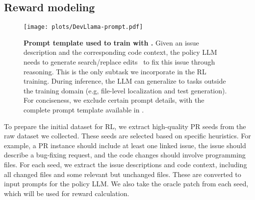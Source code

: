 \subsection{Reward modeling}
\begin{figure}[htbp]
\centering
\texttt{[image: plots/DevLlama-prompt.pdf]}
\caption{\textbf{Prompt template used to train \ours with \tech.}
Given an issue description and the corresponding code context, the policy LLM needs to generate search/replace edits~\cite{agentless} to fix this issue through reasoning.
This is the only subtask we incorporate in the RL training.
During inference, the LLM can generalize to tasks outside the training domain (e.g, file-level localization and test generation).
For conciseness, we exclude certain prompt details, with the complete prompt template available in .}
\label{fig:prompt}
\end{figure}

To prepare the initial dataset for RL, we extract high-quality PR seeds from the raw dataset we collected.
These seeds are selected based on specific heuristics. For example, a PR instance should include at least one linked issue, the issue should describe a bug-fixing request, and the code changes should involve programming files.
For each seed, we extract the issue descriptions and code context, including all changed files and some relevant but unchanged files.
These are converted to input prompts for the policy LLM.
We also take the oracle patch from each seed, which will be used for reward calculation.


